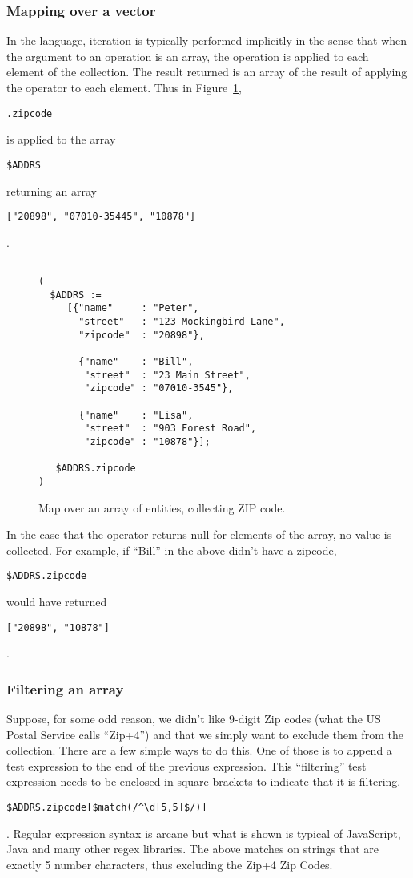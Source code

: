 \documentclass[9pt,letterpaper]{article}
\newcommand{\stt}[1]{\begin{footnotesize}\texttt{#1}\end{footnotesize}}
\begin{document}
\subsubsection{Mapping over a vector}
In the language, iteration is typically performed implicitly in the sense that when the argument to an operation is an array, the operation is applied to each element of the collection.
The result returned is an array of the result of applying the operator to each element.
Thus in Figure~\ref{code:simple-map}, \stt{.zipcode} is applied to the array \stt{\$ADDRS} returning  an array \stt{["20898", "07010-35445", "10878"]}.

\lstset{
    basicstyle=\footnotesize\ttfamily
  }

\begin{figure}[H]
    \caption{Map over an array of entities, collecting ZIP code.}
    \label{code:simple-map}
\begin{lstlisting}[basicstyle=\ttfamily\scriptsize]

(
  $ADDRS :=
     [{"name"     : "Peter",
       "street"   : "123 Mockingbird Lane",
       "zipcode"  : "20898"},
       
       {"name"    : "Bill",
        "street"  : "23 Main Street",
        "zipcode" : "07010-3545"},
        
       {"name"    : "Lisa",
        "street"  : "903 Forest Road",
        "zipcode" : "10878"}];

   $ADDRS.zipcode
)

\end{lstlisting}
\end{figure}    

  In the case that the operator returns null for elements of the array, no value is collected.
  For example, if ``Bill'' in the above didn't have a zipcode, \stt{\$ADDRS.zipcode} would have returned \stt{["20898", "10878"]}.

\subsubsection{Filtering  an array}
Suppose, for some odd reason, we didn't like 9-digit Zip codes (what the US Postal Service calls ``Zip+4'') and that we simply want to exclude them from the collection.
There are a few simple ways to do this.
One of those is to append a test expression to the end of the previous expression. This ``filtering'' test expression needs to be enclosed in square brackets to indicate that it is filtering.
\stt{\$ADDRS.zipcode[\$match(/\^{}\textbackslash d[5,5]\$/)]}. Regular expression syntax is arcane but what is shown is typical of JavaScript, Java and many other regex libraries.
The above matches on strings that are exactly 5 number characters, thus excluding the Zip+4 Zip Codes.
\end{document}
